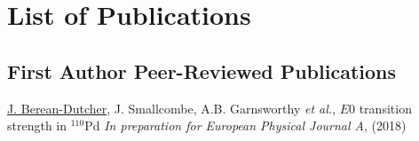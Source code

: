 \chapter{List of Publications}

\section{First Author Peer-Reviewed Publications}

\underline{J. Berean-Dutcher}, J. Smallcombe, A.B. Garnsworthy \textit{et al.}, \newline
$E0$ transition strength in $^{110}\mathrm{Pd}$ \newline
\textit{In preparation for European Physical Journal A}, (2018)
